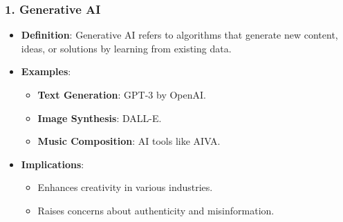 \documentclass[aspectratio=169]{beamer}
\begin{document}
\begin{frame}[fragile]
    \frametitle{1. Generative AI}
    \begin{itemize}
        \item \textbf{Definition}: 
            Generative AI refers to algorithms that generate new content, ideas, or solutions by learning from existing data.
        \item \textbf{Examples}:
            \begin{itemize}
                \item \textbf{Text Generation}: GPT-3 by OpenAI.
                \item \textbf{Image Synthesis}: DALL-E.
                \item \textbf{Music Composition}: AI tools like AIVA.
            \end{itemize}
        \item \textbf{Implications}:
            \begin{itemize}
                \item Enhances creativity in various industries.
                \item Raises concerns about authenticity and misinformation.
            \end{itemize}
    \end{itemize}
\end{frame}
\end{document}
